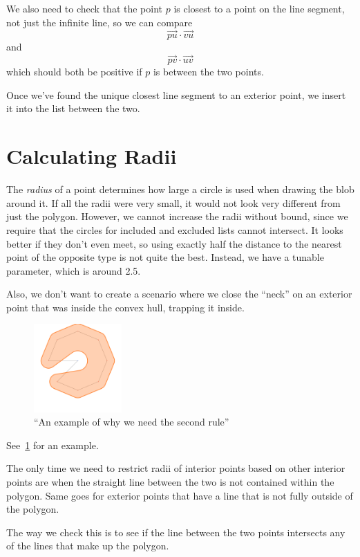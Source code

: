 \documentclass[paper=a4, fontsize=11pt]{scrartcl} %
\numberwithin{equation}{section} %
\numberwithin{figure}{section} %
\numberwithin{table}{section} %
\begin{document}
We also need to check that the point $p$ is closest to a point on the line
segment, not just the infinite line, so we can compare
\[ \vec{pu} \cdot \vec{vu} \]
and
\[ \vec{pv} \cdot \vec{uv} \]
which should both be positive if $p$ is between the two points.


Once we've found the unique closest line segment to an exterior point,
we insert it into the list between the two.

\section{Calculating Radii}
The \textit{radius} of a point determines how large a circle is used when
drawing the blob around it.  If all the radii were very small, it would not
look very different from just the polygon.  However, we cannot increase the
radii without bound, since we require that the circles for included and
excluded lists cannot intersect.  It looks better if they don't even meet,
so using exactly half the distance to the nearest point of the opposite type
is not quite the best.
Instead, we have a tunable parameter,
which is around 2.5. %

Also, we don't want to create a scenario where we close the ``neck''
on an exterior point that was inside the convex hull, trapping it inside.

\begin{figure}[h]
\includegraphics[width=0.3\textwidth]{torus_bitten}
\centering
\caption{``An example of why we need the second rule''}
\label{fig:neck}
\end{figure}

See~\ref{fig:neck} for an example.

The only time we need to restrict radii of interior points based on other
interior points are when the straight line between the two is not
contained within the polygon.  Same goes for exterior points that have a line
that is not fully outside of the polygon.

The way we check this is to see if the line between the two points intersects
any of the lines that make up the polygon.
\end{document}
